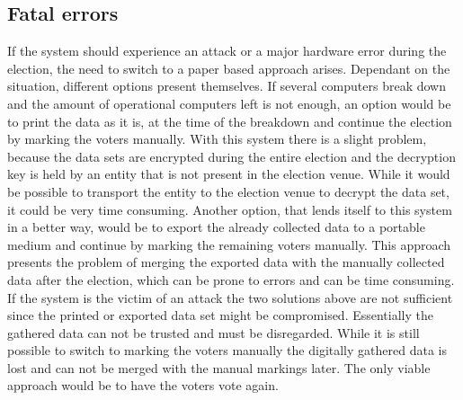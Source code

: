 \documentclass[a4paper]{report}
\begin{document}
\subsection{Fatal errors}
If the system should experience an attack or a major hardware error during the election, the need to switch to a paper based approach arises. Dependant on the situation, different options present themselves. If several computers break down and the amount of operational computers left is not enough, an option would be to print the data as it is, at the time of the breakdown and continue the election by marking the voters manually. With this system there is a slight problem, because the data sets are encrypted during the entire election and the decryption key is held by an entity that is not present in the election venue. While it would be possible to transport the entity to the election venue to decrypt the data set, it could be very time consuming. Another option, that lends itself to this system in a better way, would be to export the already collected data to a portable medium and continue by marking the remaining voters manually. This approach presents the problem of merging the exported data with the manually collected data after the election, which can be prone to errors and can be time consuming. \\

If the system is the victim of an attack the two solutions above are not sufficient since the printed or exported data set might be compromised. Essentially the gathered data can not be trusted and must be disregarded. While it is still possible to switch to marking the voters manually the digitally gathered data is lost and can not be merged with the manual markings later. The only viable approach would be to have the voters vote again.
\end{document}
